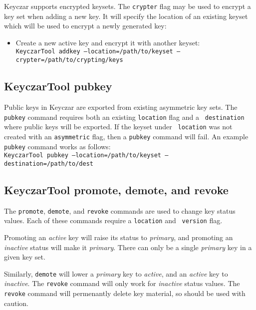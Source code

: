 \documentclass{llncs}
\begin{document}
Keyczar supports encrypted keysets. The {\tt crypter} flag may be used to
encrypt a key set when adding a new key. It will specify the location of an
existing keyset which will be used to encrypt a newly generated key: 
 
\begin{itemize}
\item Create a new active key and encrypt it with another keyset: \\
{\tt KeyczarTool addkey --location=/path/to/keyset
--crypter=/path/to/crypting/keys}
\end{itemize}

\subsection{KeyczarTool pubkey}

Public keys in Keyczar are exported from existing asymmetric key sets. The
{\tt pubkey} command requires both an existing {\tt location} flag and a {\tt
destination} where public keys will be exported. If the keyset under {\tt
location} was not created with an {\tt asymmetric} flag, then a {\tt pubkey}
command will fail. An example {\tt pubkey} command works as follows: \\
{\tt KeyczarTool pubkey --location=/path/to/keyset --destination=/path/to/dest}

\subsection{KeyczarTool promote, demote, and revoke}

The {\tt promote}, {\tt demote}, and {\tt revoke} commands are used to change
key status values. Each of these commands require a {\tt location} and {\tt
version} flag. 

Promoting an {\it active} key will raise its status to
{\it primary}, and promoting an {\it inactive} status will make
it {\it primary}. There can only be a single {\it primary} key in a given key
set. 

Similarly, {\tt demote} will lower a {\it primary} key to {\it active},
and an {\it active} key to {\it inactive}. The {\tt revoke}
command will only work for {\it inactive} status values.
The {\tt revoke} command will permenantly delete key material, so should be
used with caution.
\end{document}
